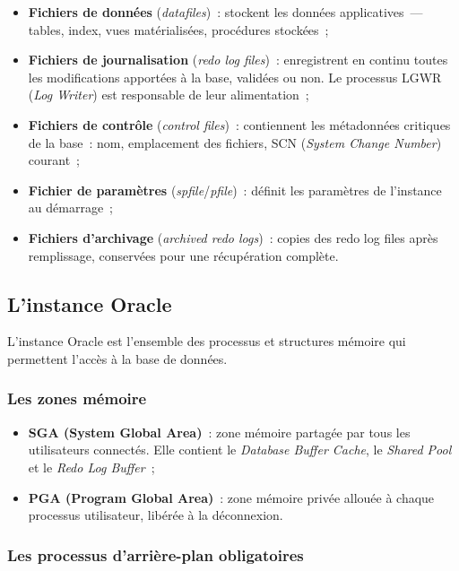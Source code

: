 \documentclass[12pt,a4paper]{report}
\begin{document}
\begin{itemize}[leftmargin=*]
  \item \textbf{Fichiers de donn\'ees} (\emph{datafiles})~: stockent les donn\'ees
        applicatives~--- tables, index, vues mat\'erialis\'ees, proc\'edures stock\'ees~;
  \item \textbf{Fichiers de journalisation} (\emph{redo log files})~: enregistrent en
        continu toutes les modifications apport\'ees \`a la base, valid\'ees ou non. Le
        processus LGWR (\emph{Log Writer}) est responsable de leur alimentation~;
  \item \textbf{Fichiers de contr\^ole} (\emph{control files})~: contiennent les
        m\'etadonn\'ees critiques de la base~: nom, emplacement des fichiers, SCN
        (\emph{System Change Number}) courant~;
  \item \textbf{Fichier de param\`etres} (\emph{spfile}/\emph{pfile})~: d\'efinit les
        param\`etres de l'instance au d\'emarrage~;
  \item \textbf{Fichiers d'archivage} (\emph{archived redo logs})~: copies des redo log
        files apr\`es remplissage, conserv\'ees pour une r\'ecup\'eration compl\`ete.
\end{itemize}

\subsection{L'instance Oracle}

L'instance Oracle est l'ensemble des processus et structures m\'emoire qui permettent
l'acc\`es \`a la base de donn\'ees.

\subsubsection{Les zones m\'emoire}

\begin{itemize}[leftmargin=*]
  \item \textbf{SGA (System Global Area)}~: zone m\'emoire partag\'ee par tous les
        utilisateurs connect\'es. Elle contient le \emph{Database Buffer Cache},
        le \emph{Shared Pool} et le \emph{Redo Log Buffer}~;
  \item \textbf{PGA (Program Global Area)}~: zone m\'emoire priv\'ee allou\'ee \`a
        chaque processus utilisateur, lib\'er\'ee \`a la d\'econnexion.
\end{itemize}

\subsubsection{Les processus d'arri\`ere-plan obligatoires}
\end{document}
